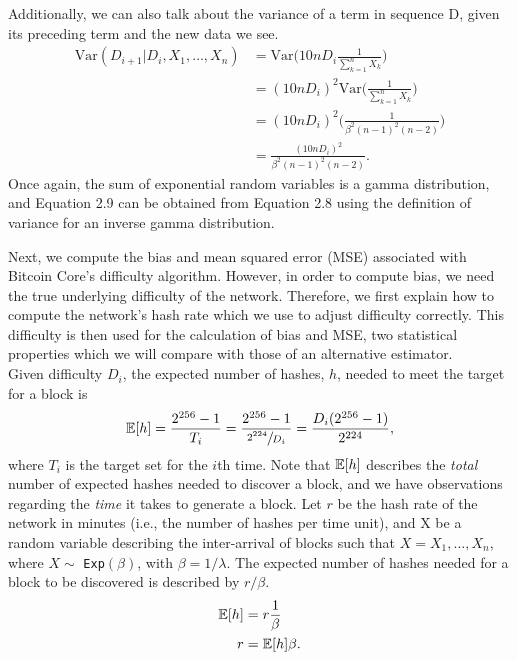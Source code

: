 Additionally, we can also talk about the variance of a term in sequence D, given its preceding term and the new data we see. 
\begin{align}
\text{Var}(D_{i+1} | D_{i}, X_1, \dots, X_{n}) &= \text{Var}\bigg(10n D_i \frac{1}{\sum_{k=1}^{n} X_k}\bigg) \\
&= (10n D_i)^2 \text{Var}\bigg(\frac{1}{\sum_{k=1}^{n} X_k}\bigg) \\ 
&= (10n D_i)^2 \Bigg(\frac{1}{\beta^2(n-1)^2(n-2)}\Bigg) \\
&= \frac{(10n D_i)^2}{\beta^2(n-1)^2(n-2)}.
\end{align}
Once again, the sum of exponential random variables is a gamma distribution, and Equation 2.9 can be obtained from Equation 2.8 using the definition of variance for an inverse gamma distribution.

Next, we compute the bias and mean squared error (MSE) associated with Bitcoin Core's difficulty algorithm. However, in order to compute bias, we need the true underlying difficulty of the network. Therefore, we first explain how to compute the network's hash rate which we use to adjust difficulty correctly. This difficulty is then used for the calculation of bias and MSE, two statistical properties which we will compare with those of an alternative estimator. \\
Given difficulty $D_i$, the expected number of hashes, $h$, needed to meet the target for a block is
\begin{align}
\operatorname{\mathbb{E}}[h] =  \frac{2^{256}-1}{T_i} = \frac{2^{256}-1}{\sfrac{2^{224}}{D_i}} = \frac{D_i(2^{256}-1)}{2^{224}}, 
\end{align}
where $T_i$ is the target set for the $i$th time. Note that $\operatorname{\mathbb{E}}[h]$ describes the \textit{total} number of expected hashes needed to discover a block, and we have observations regarding the \textit{time} it takes to generate a block. Let $r$ be the hash rate of the network in minutes (i.e., the number of hashes per time unit), and X be a random variable describing the inter-arrival of blocks such that $X = X_1, \dots, X_{n}$, where $X \sim$ \texttt{Exp}$(\beta)$, with $\beta = 1/\lambda$. The expected number of hashes needed for a block to be discovered is described by $r/\beta$.
\begin{align}
\operatorname{\mathbb{E}}[h] &= r \frac{1}{\beta}  \\
r &= \operatorname{\mathbb{E}}[h] \beta.
\end{align}

